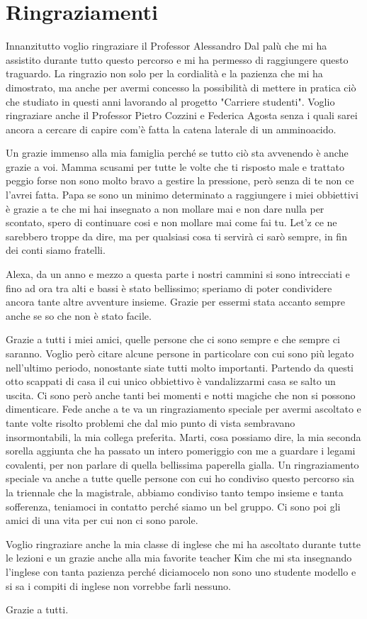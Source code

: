 \chapter*{Ringraziamenti}
Innanzitutto voglio ringraziare il Professor Alessandro Dal palù che mi ha assistito durante tutto questo percorso e mi ha permesso di raggiungere questo traguardo. La ringrazio non solo per la cordialità e la pazienza che mi ha dimostrato, ma anche per avermi concesso la possibilità di mettere in pratica ciò che studiato in questi anni lavorando al progetto "Carriere studenti". Voglio ringraziare anche il Professor Pietro Cozzini e Federica Agosta senza i quali sarei ancora a cercare di capire com'è fatta la catena laterale di un amminoacido.

Un grazie immenso alla mia famiglia perché se tutto ciò sta avvenendo è anche grazie a voi. Mamma scusami per tutte le volte che ti risposto male e trattato peggio forse non sono molto bravo a gestire la pressione, però senza di te non ce l'avrei fatta. Papa se sono un minimo determinato a raggiungere i miei obbiettivi è grazie a te che mi hai insegnato a non mollare mai e non dare nulla per scontato, spero di continuare cosi e non mollare mai come fai tu. Let'z ce ne sarebbero troppe da dire, ma per qualsiasi cosa ti servirà ci sarò sempre, in fin dei conti siamo fratelli. 

Alexa, da un anno e mezzo a questa parte i nostri cammini si sono intrecciati e fino ad ora tra alti e bassi è stato bellissimo; speriamo di poter condividere ancora tante altre avventure insieme. Grazie per essermi stata accanto sempre anche se so che non è stato facile.

Grazie a tutti i miei amici, quelle persone che ci sono sempre e che sempre ci saranno. Voglio però citare alcune persone in particolare con cui sono più legato nell'ultimo periodo, nonostante siate tutti molto importanti. Partendo da questi otto scappati di casa il cui unico obbiettivo è vandalizzarmi casa se salto un uscita. Ci sono però anche tanti bei momenti e notti magiche che non si possono dimenticare. Fede anche a te va un ringraziamento speciale per avermi ascoltato e tante volte risolto problemi che dal mio punto di vista sembravano insormontabili, la mia collega preferita. Marti, cosa possiamo dire, la mia seconda sorella aggiunta che ha passato un intero pomeriggio con me a guardare i legami covalenti, per non parlare di quella bellissima paperella gialla. Un ringraziamento speciale va anche a tutte quelle persone con cui ho condiviso questo percorso sia la triennale che la magistrale, abbiamo condiviso tanto tempo insieme e tanta sofferenza, teniamoci in contatto perché siamo un bel gruppo. Ci sono poi gli amici di una vita per cui non ci sono parole. 

Voglio ringraziare anche la mia classe di inglese che mi ha ascoltato durante tutte le lezioni e un grazie anche alla mia favorite teacher Kim che mi sta insegnando l'inglese con tanta pazienza perché diciamocelo non sono uno studente modello e si sa i compiti di inglese non vorrebbe farli nessuno.

Grazie a tutti.